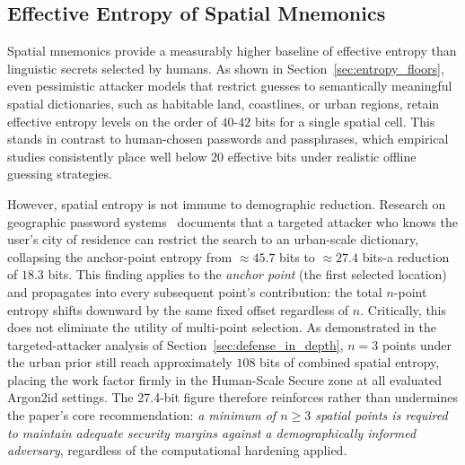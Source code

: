 \documentclass[journal,article,submit,pdftex,moreauthors]{Definitions/mdpi}
\newcommand{\add}[1]{#1}
\newcommand{\remove}[1]{}
\newcommand{\add}[1]{\added{#1}}
\newcommand{\remove}[1]{\deleted{#1}}
\begin{document}
\subsection{Effective Entropy of Spatial Mnemonics}

\remove{A central finding of this study is that spatial mnemonics provide a higher baseline of effective entropy than linguistic secrets selected by humans.}\add{Spatial mnemonics provide a measurably higher baseline of effective entropy than linguistic secrets selected by humans.} As shown in Section~\ref{sec:entropy_floors}, even pessimistic attacker models that restrict guesses to semantically meaningful spatial dictionaries, such as habitable land, coastlines, or urban regions, retain effective entropy levels on the order of $40$-$42$ bits for a single spatial cell. This stands in contrast to human-chosen passwords and passphrases, which empirical studies consistently place well below $20$ effective bits under realistic offline guessing strategies.

However, spatial entropy is not immune to demographic reduction. Research on geographic password systems~\cite{Sun2012, Thorpe2013, AlAmeen2014} documents that a targeted attacker who knows the user's city of residence can restrict the search to an urban-scale dictionary, collapsing the anchor-point entropy from $\approx\!45.7$ bits to $\approx\!27.4$ bits-a reduction of $18.3$ bits. This finding applies to the \emph{anchor point} (the first selected location) and propagates into every subsequent point's contribution: the total $n$-point entropy shifts downward by the same fixed offset regardless of $n$. Critically, this does not eliminate the utility of multi-point selection. As demonstrated in the targeted-attacker analysis of Section~\ref{sec:defense_in_depth}, $n=3$ points under the urban prior still reach approximately $108$ bits of combined spatial entropy, placing the work factor firmly in the Human-Scale Secure zone at all evaluated Argon2id settings. The 27.4-bit figure therefore reinforces rather than undermines the paper's core recommendation: \emph{a minimum of $n \geq 3$ spatial points is required to maintain adequate security margins against a demographically informed adversary}, regardless of the computational hardening applied.
\end{document}
